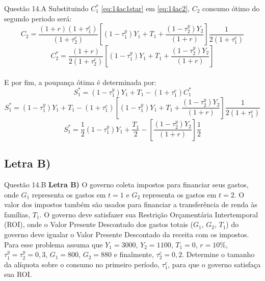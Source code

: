 \documentclass[aspectratio=169]{beamer}
\begin{document}
\begin{frame}{Questão 14.A}
Substituindo $C_1^*$ \eqref{eq:14ac1star} em \eqref{eq:14ac2}, $C_2$ consumo ótimo do segundo periodo será:
\begin{equation}
    C_2 = \frac{(1+r)(1+\tau_1^c)}{(1+\tau_2^c)}\left[(1-\tau_1^y)Y_1 + T_1 + \frac{(1-\tau_2^y)Y_2}{(1+r)}\right]\frac{1}{2(1+\tau_1^c)}
\end{equation}
\begin{equation}\label{eq:14ac2star}
    C_2^* = \frac{(1+r)}{2(1+\tau_2^c)}\left[(1-\tau_1^y)Y_1 + T_1 + \frac{(1-\tau_2^y)Y_2}{(1+r)}\right]
\end{equation}
\\
E por fim, a poupança ótima é determinada por:
\begin{equation}
    S_1^* = (1-\tau_1^y)Y_1 + T_1 - (1+\tau_1^c)C_1^*
\end{equation}
\begin{equation}
    S_1^* = (1-\tau_1^y)Y_1 + T_1 - (1+\tau_1^c)\left[(1-\tau_1^y)Y_1 + T_1 + \frac{(1-\tau_2^y)Y_2}{(1+r)}\right]\frac{1}{2(1+\tau_1^c)}
\end{equation}
\begin{equation}
    S_1^* = \frac{1}{2}(1-\tau_1^y)Y_1 + \frac{T_1}{2} - \left[\frac{(1-\tau_2^y)Y_2}{(1+r)}\right]\frac{1}{2}
\end{equation}
\end{frame}

\subsection{Letra B)}
\begin{frame}{Questão 14.B}
\textbf{Letra B)} O governo coleta impostos para financiar seus gastos, onde $G_1$ representa os gastos em $t=1$ e $G_2$ representa os gastos em $t=2$. O valor dos impostos também são usados para financiar a transferência de renda às famílias, $T_1$. O governo deve satisfazer sua Restrição Orçamentária Intertemporal (ROI), onde o Valor Presente Descontado dos gastos totais ($G_1$, $G_2$, $T_1$) do governo deve igualar o Valor Presente Descontado da receita com os impostos. Para esse problema assuma que $Y_1 = 3000$, $Y_2 = 1100$, $T_1 = 0$, $r = 10\%$, $\tau_1^y = \tau_2^y = 0,3$, $G_1 = 800$, $G_2 = 880$ e finalmente, $\tau_2^c = 0,2$. Determine o tamanho da alíquota sobre o consumo no primeiro período, $\tau_1^c$, para que o governo satisfaça sua ROI.
\end{frame}
\end{document}
